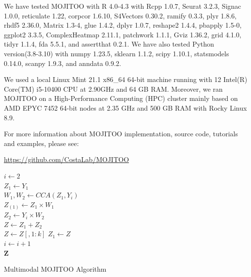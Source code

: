 We have tested MOJITOO with R 4.0-4.3 with Rcpp 1.0.7, Seurat 3.2.3,  Signac 1.0.0, reticulate 1.22, corpcor 1.6.10,  S4Vectors 0.30.2,  ramify 0.3.3,  plyr 1.8.6,  rhdf5 2.36.0,  Matrix 1.3-4,  glue 1.4.2,  dplyr 1.0.7,  reshape2 1.4.4,  pbapply 1.5-0,  ggplot2 3.3.5, ComplexHeatmap 2.11.1, patchwork 1.1.1, Gviz 1.36.2, grid 4.1.0, tidyr 1.1.4, fda 5.5.1, and assertthat 0.2.1. We have also tested Python version(3.8-3.10) with numpy 1.23.5, sklearn 1.1.2, scipy 1.10.1, statsmodels 0.14.0, scanpy 1.9.3, and anndata 0.9.2.

We used a local Linux Mint 21.1 x86\_64 64-bit machine running with 12 Intel(R) Core(TM) i5-10400 CPU at 2.90GHz and 64 GB RAM. Moreover, we ran MOJITOO on a High-Performance Computing (HPC) cluster mainly based on AMD EPYC 7452 64-bit nodes at 2.35 GHz and 500 GB RAM with  Rocky Linux 8.9.

For more information about MOJITOO implementation, source code, tutorials and examples, please see:
\begin{center}
\url{https://github.com/CostaLab/MOJITOO}
\end{center}



\begin{algorithm}

	$i \gets 2$ \\
	$Z_{1} \gets Y_{1}$ \\
	{
		$W_{1}, W_{2} \gets CCA(Z_{1}, Y_{i})$ \\
		$Z_{(1)} \gets Z_{1}\times W_{1}$ \\
		$Z_{2} \gets Y_{i}\times W_{2}$  \\
		$Z \gets Z_{1} + Z_{2}$ \\
		$Z \gets Z[, 1:k]$
		$Z_{1} \gets Z$ \\
		$i \gets i+1$  \\
	}
	\Return $\mathbf{Z}$
	\caption{Multimodal MOJITOO Algorithm }
	\label{alg:MOJITOO}
\end{algorithm}

